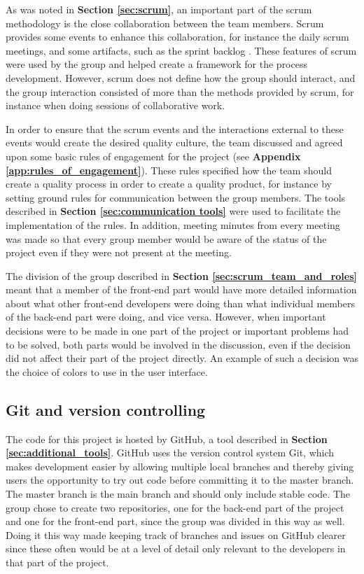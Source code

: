 As was noted in \textbf{Section \ref{sec:scrum}}, an important part of the scrum methodology is the close collaboration between the team members. Scrum provides some events to enhance this collaboration, for instance the daily scrum meetings, and some artifacts, such as the sprint backlog . These features of scrum were used by the group and helped create a framework for the process development. However, scrum does not define how the group should interact, and the group interaction consisted of more than the methods provided by scrum, for instance when doing sessions of collaborative work.\newline

In order to ensure that the scrum events and the interactions external to these events would create the desired quality culture, the team discussed and agreed upon some basic rules of engagement for the project (see \textbf{Appendix \ref{app:rules_of_engagement}}). These rules specified how the team should create a quality process in order to create a quality product, for instance by setting ground rules for communication between the group members. The tools described in \textbf{Section \ref{sec:communication tools}} were used to facilitate the implementation of the rules. In addition, meeting minutes from every meeting was made so that every group member would be aware of the status of the project even if they were not present at the meeting.\newline

The division of the group described in \textbf{Section \ref{sec:scrum_team_and_roles}} meant that a member of the front-end part would have more detailed information about what other front-end developers were doing than what individual members of the back-end part were doing, and vice versa. However, when important decisions were to be made in one part of the project or important problems had to be solved, both parts would be involved in the discussion, even if the decision did not affect their part of the project directly. An example of such a decision was the choice of colors to use in the user interface.

\subsection{Git and version controlling}

The code for this project is hosted by GitHub, a tool described in \textbf{Section \ref{sec:additional_tools}}. GitHub uses the version control system Git, which makes development easier by allowing multiple local branches and thereby giving users the opportunity to try out code before committing it to the master branch. The master branch is the main branch and should only include stable code. The group chose to create two repositories, one for the back-end part of the project and one for the front-end part, since the group was divided in this way as well. Doing it this way made keeping track of branches and issues on GitHub clearer since these often would be at a level of detail only relevant to the developers in that part of the project. 

